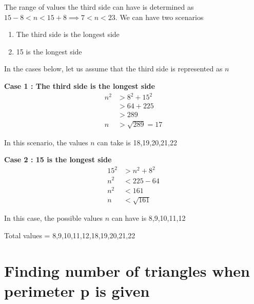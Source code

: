 
The range of values the third side can have is determined as $15 - 8 < n < 15 + 8 \implies 7 < n < 23$. We can have two scenarios

\begin{enumerate}
    \item The third side is the longest side
    \item 15 is the longest side
\end{enumerate}

In the cases below, let us assume that the third side is represented as $n$

\textbf{Case 1 : The third side is the longest side}
\begin{align*}
    n^2 &> 8^2 + 15^2 \\
    &> 64 + 225 \\
    &> 289 \\
    n &> \sqrt{289} = 17 \tag{$n$ in this case, will be a positive value only} 
\end{align*}

In this scenario, the values $n$ can take is 18,19,20,21,22

\textbf{Case 2 : 15 is the longest side}
\begin{align*}
    15^2 &> n^2 + 8^2 \\
    n^2 &< 225 - 64 \\
    n^2 &< 161 \\
    n &< \sqrt{161} \tag{$n$ in this case, will be a positive value only}
\end{align*}

In this case, the possible values $n$ can have is 8,9,10,11,12

Total values = 8,9,10,11,12,18,19,20,21,22


\newpage

















\section{Finding number of triangles when perimeter p is given}

